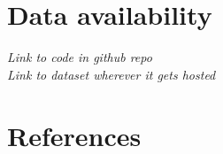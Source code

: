 \documentclass[12pt]{article}\usepackage[]{graphicx}\usepackage[]{color}
\begin{document}
\hypertarget{data-availability}{%
\section{Data availability}\label{data-availability}}

\emph{Link to code in github repo}\\
\emph{Link to dataset wherever it gets hosted}

\clearpage

\hypertarget{references}{%
\section{References}\label{references}}

\noindent \vspace{-2em} \setlength{\parindent}{-0.2in} \setlength{\leftskip}{0.2in} \setlength{\parskip}{8pt}
\end{document}
